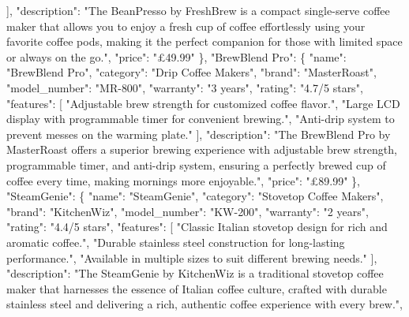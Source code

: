 \documentclass[
  letterpaper,
  DIV=11,
  numbers=noendperiod]{scrreprt}
\newenvironment{Shaded}{\begin{snugshade}}{\end{snugshade}}
\newcommand{\NormalTok}[1]{\textcolor[rgb]{0.00,0.23,0.31}{#1}}
\newcommand{\StringTok}[1]{\textcolor[rgb]{0.13,0.47,0.30}{#1}}
\begin{document}
\begin{Shaded}
\begin{Highlighting}[]
\NormalTok{      ],}
      \StringTok{"description"}\NormalTok{: }\StringTok{"The BeanPresso by FreshBrew is a compact single{-}serve coffee maker that allows you to enjoy a fresh cup of coffee effortlessly using your favorite coffee pods, making it the perfect companion for those with limited space or always on the go."}\NormalTok{,}
      \StringTok{"price"}\NormalTok{: }\StringTok{"£49.99"}
\NormalTok{    \},}
    \StringTok{"BrewBlend Pro"}\NormalTok{: \{}
      \StringTok{"name"}\NormalTok{: }\StringTok{"BrewBlend Pro"}\NormalTok{,}
      \StringTok{"category"}\NormalTok{: }\StringTok{"Drip Coffee Makers"}\NormalTok{,}
      \StringTok{"brand"}\NormalTok{: }\StringTok{"MasterRoast"}\NormalTok{,}
      \StringTok{"model\_number"}\NormalTok{: }\StringTok{"MR{-}800"}\NormalTok{,}
      \StringTok{"warranty"}\NormalTok{: }\StringTok{"3 years"}\NormalTok{,}
      \StringTok{"rating"}\NormalTok{: }\StringTok{"4.7/5 stars"}\NormalTok{,}
      \StringTok{"features"}\NormalTok{: [}
        \StringTok{"Adjustable brew strength for customized coffee flavor."}\NormalTok{,}
        \StringTok{"Large LCD display with programmable timer for convenient brewing."}\NormalTok{,}
        \StringTok{"Anti{-}drip system to prevent messes on the warming plate."}
\NormalTok{      ],}
      \StringTok{"description"}\NormalTok{: }\StringTok{"The BrewBlend Pro by MasterRoast offers a superior brewing experience with adjustable brew strength, programmable timer, and anti{-}drip system, ensuring a perfectly brewed cup of coffee every time, making mornings more enjoyable."}\NormalTok{,}
      \StringTok{"price"}\NormalTok{: }\StringTok{"£89.99"}
\NormalTok{    \},}
    \StringTok{"SteamGenie"}\NormalTok{: \{}
      \StringTok{"name"}\NormalTok{: }\StringTok{"SteamGenie"}\NormalTok{,}
      \StringTok{"category"}\NormalTok{: }\StringTok{"Stovetop Coffee Makers"}\NormalTok{,}
      \StringTok{"brand"}\NormalTok{: }\StringTok{"KitchenWiz"}\NormalTok{,}
      \StringTok{"model\_number"}\NormalTok{: }\StringTok{"KW{-}200"}\NormalTok{,}
      \StringTok{"warranty"}\NormalTok{: }\StringTok{"2 years"}\NormalTok{,}
      \StringTok{"rating"}\NormalTok{: }\StringTok{"4.4/5 stars"}\NormalTok{,}
      \StringTok{"features"}\NormalTok{: [}
        \StringTok{"Classic Italian stovetop design for rich and aromatic coffee."}\NormalTok{,}
        \StringTok{"Durable stainless steel construction for long{-}lasting performance."}\NormalTok{,}
        \StringTok{"Available in multiple sizes to suit different brewing needs."}
\NormalTok{      ],}
      \StringTok{"description"}\NormalTok{: }\StringTok{"The SteamGenie by KitchenWiz is a traditional stovetop coffee maker that harnesses the essence of Italian coffee culture, crafted with durable stainless steel and delivering a rich, authentic coffee experience with every brew."}\NormalTok{,}

\end{Highlighting}
\end{Shaded}
\end{document}
